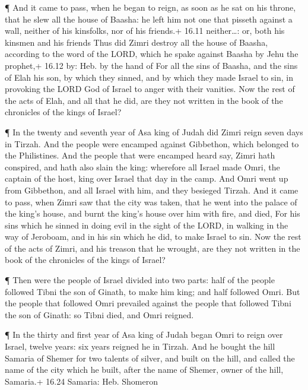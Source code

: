  ¶ And it came to pass, when he began to reign, as soon as
he sat on his throne, that he slew all the house of Baasha: he left him
not one that pisseth against a wall, neither of his kinsfolks, nor of
his friends.+ 16.11 neither\ldots: or, both his kinsmen and his friends
 Thus did Zimri destroy all the house of Baasha, according
to the word of the LORD, which he spake against Baasha by Jehu the
prophet,+ 16.12 by: Heb. by the hand of  For all the sins
of Baasha, and the sins of Elah his son, by which they sinned, and by
which they made Israel to sin, in provoking the LORD God of Israel to
anger with their vanities.  Now the rest of the acts of
Elah, and all that he did, are they not written in the book of the
chronicles of the kings of Israel?

 ¶ In the twenty and seventh year of Asa king of Judah did
Zimri reign seven days in Tirzah. And the people were encamped against
Gibbethon, which belonged to the Philistines.  And the
people that were encamped heard say, Zimri hath conspired, and hath also
slain the king: wherefore all Israel made Omri, the captain of the host,
king over Israel that day in the camp.  And Omri went up
from Gibbethon, and all Israel with him, and they besieged Tirzah.
 And it came to pass, when Zimri saw that the city was
taken, that he went into the palace of the king's house, and burnt the
king's house over him with fire, and died,  For his sins
which he sinned in doing evil in the sight of the LORD, in walking in
the way of Jeroboam, and in his sin which he did, to make Israel to sin.
 Now the rest of the acts of Zimri, and his treason that he
wrought, are they not written in the book of the chronicles of the kings
of Israel?

 ¶ Then were the people of Israel divided into two parts:
half of the people followed Tibni the son of Ginath, to make him king;
and half followed Omri.  But the people that followed Omri
prevailed against the people that followed Tibni the son of Ginath: so
Tibni died, and Omri reigned.

 ¶ In the thirty and first year of Asa king of Judah began
Omri to reign over Israel, twelve years: six years reigned he in Tirzah.
 And he bought the hill Samaria of Shemer for two talents
of silver, and built on the hill, and called the name of the city which
he built, after the name of Shemer, owner of the hill, Samaria.+ 16.24
Samaria: Heb. Shomeron

